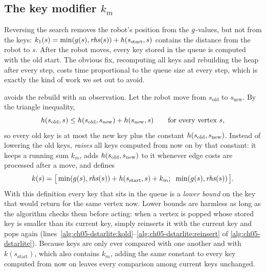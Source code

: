 \subsection{The key modifier \texorpdfstring{$k_m$}{k\_m}}
\label{sec:ch05-km}

Reversing the search removes the robot's position from the $g$-values, but not
from the keys: $k_1(s) = \min(g(s),\mathit{rhs}(s)) + h(s_{\mathrm{start}}, s)$
contains the distance from the robot to $s$. After the robot moves, every key stored in
the queue is computed with the old start. The obvious fix, recomputing all keys and
rebuilding the heap after every step, costs time proportional to the queue size at
every step, which is exactly the kind of work we set out to avoid.

\dstarlite avoids the rebuild with an observation. Let the robot move from $s_{\mathrm{old}}$
to $s_{\mathrm{new}}$. By the triangle inequality,
\begin{equation}
\label{eq:ch05-triangle}
h(s_{\mathrm{old}}, s) \le h(s_{\mathrm{old}}, s_{\mathrm{new}}) + h(s_{\mathrm{new}}, s)
\qquad\text{for every vertex } s,
\end{equation}
so every old key is at most the new key plus the constant
$h(s_{\mathrm{old}}, s_{\mathrm{new}})$. Instead of lowering the old keys, \dstarlite
\emph{raises} all keys computed from now on by that constant: it keeps a running sum
$k_m$, adds $h(s_{\mathrm{old}}, s_{\mathrm{new}})$ to it whenever edge costs are
processed after a move, and defines
\begin{equation}
\label{eq:ch05-dslkey}
k(s) = \bigl[\,\min(g(s),\mathit{rhs}(s)) + h(s_{\mathrm{start}}, s) + k_m;\;\;
\min(g(s),\mathit{rhs}(s))\,\bigr].
\end{equation}
With this definition every key that sits in the queue is a \emph{lower bound} on the
key that \DslCalculateKey would return for the same vertex now. Lower bounds are
harmless as long as the algorithm checks them before acting: when a vertex is popped
whose stored key is smaller than its current key, \dstarlite simply reinserts it with
the current key and pops again (lines~\ref{alg:ch05-dstarlite:kold}--\ref{alg:ch05-dstarlite:reinsert}
of \cref{alg:ch05-dstarlite}). Because keys are only ever compared with one another and
with $k(s_{\mathrm{start}})$, which also contains $k_m$, adding the same constant to
every key computed from now on leaves every comparison among current keys unchanged.

